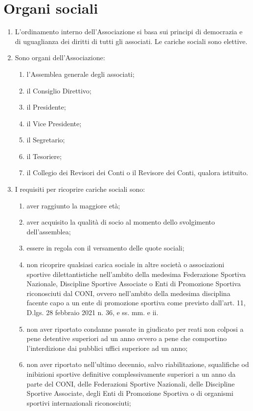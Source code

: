 \documentclass{djtsdoc}
\begin{document}
	\section{Organi sociali}
	\begin{enumerate}
		\item L'ordinamento interno dell'Associazione si basa sui principi di democrazia e di uguaglianza dei diritti di tutti gli associati. Le cariche sociali sono elettive.
		\item Sono organi dell'Associazione:
		\begin{enumerate}
			\item l'Assemblea generale degli associati;
			\item il Consiglio Direttivo;
			\item il Presidente;
			\item il Vice Presidente;
			\item il Segretario;
			\item il Tesoriere;
			\item il Collegio dei Revisori dei Conti o il Revisore dei Conti, qualora istituito.
		\end{enumerate}
		\item I requisiti per ricoprire cariche sociali sono:
		\begin{enumerate}
			\item aver raggiunto la maggiore età;
			\item aver acquisito la qualità di socio al momento dello svolgimento dell'assemblea;
			\item essere in regola con il versamento delle quote sociali;
			\item non ricoprire qualsiasi carica sociale in altre società o associazioni sportive dilettantistiche nell'ambito della medesima Federazione Sportiva Nazionale, Discipline Sportive Associate o Enti di Promozione Sportiva riconosciuti dal CONI, ovvero nell'ambito della medesima disciplina facente capo a un ente di promozione sportiva come previsto dall'art. 11, D.lgs. 28 febbraio 2021 n. 36, e ss. mm. e ii.
			\item non aver riportato condanne passate in giudicato per reati non colposi a pene detentive superiori ad un anno ovvero a pene che comportino l'interdizione dai pubblici uffici superiore ad un anno;
			\item non aver riportato nell'ultimo decennio, salvo riabilitazione, squalifiche od inibizioni sportive definitive complessivamente superiori a un anno da parte del CONI, delle Federazioni Sportive Nazionali, delle Discipline Sportive Associate, degli Enti di Promozione Sportiva o di organismi sportivi internazionali riconosciuti;

\end{enumerate}
\end{enumerate}
\end{document}

